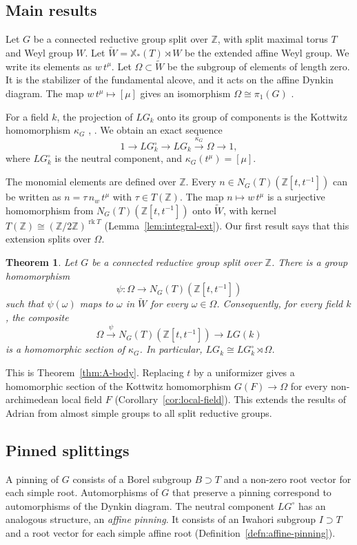 \documentclass[psamsfonts]{amsart}
\theoremstyle{definition}
\theoremstyle{remark}
\numberwithin{equation}{section}
\newcommand{\Z}{\mathbb{Z}}   %
\newcommand{\X}{\mathbb{X}}
\newcommand{\extw}{\widetilde{W}}
\newcommand{\ra}{\rightarrow}
\newcommand{\xra}{\xrightarrow}
\DeclareMathOperator{\rk}{rk}
\numberwithin{equation}{section}
\newcommand{\om}{\omega}
\newcommand{\Om}{\Omega}
\theoremstyle{plain}
\newtheorem{introthm}{Theorem}
\begin{document}
\subsection{Main results}
Let $G$ be a connected reductive group split over $\Z$, with split maximal torus $T$ and Weyl group $W$. Let $\extw=\X_*(T)\rtimes W$ be the extended affine Weyl group. We write its elements as $w\,t^{\mu}$. Let $\Om\subset\extw$ be the subgroup of elements of length zero. It is the stabilizer of the fundamental alcove, and it acts on the affine Dynkin diagram. The map $w\,t^{\mu}\mapsto[\mu]$ gives an isomorphism $\Om\cong\pi_1(G)$ \cite[Lemma~14]{HR08}.

For a field $k$, the projection of $LG_k$ onto its group of components is the Kottwitz homomorphism $\kappa_G$ \cite[\S7]{Ko97}, \cite[\S5]{PR08}. We obtain an exact sequence
\begin{equation}\label{eq:Kottwitz-seq}
1\ra LG_k^{\circ}\ra LG_k\xra{\kappa_G}\Om\ra 1,
\end{equation}
where $LG_k^{\circ}$ is the neutral component, and $\kappa_G(t^{\mu})=[\mu]$.

The monomial elements are defined over $\Z$. Every $n\in N_G(T)(\Z[t,t^{-1}])$ can be written as $n=\tau\,n_w\,t^{\mu}$ with $\tau\in T(\Z)$. The map $n\mapsto w\,t^{\mu}$ is a surjective homomorphism from $N_G(T)(\Z[t,t^{-1}])$ onto $\extw$, with kernel $T(\Z)\cong(\Z/2\Z)^{\rk T}$ (Lemma~\ref{lem:integral-ext}). Our first result says that this extension splits over $\Om$.

\begin{introthm}\label{thm:A}
Let $G$ be a connected reductive group split over $\Z$. There is a group homomorphism
\[
\psi\colon\Om\ra N_G(T)(\Z[t,t^{-1}])
\]
such that $\psi(\om)$ maps to $\om$ in $\extw$ for every $\om\in\Om$. Consequently, for every field $k$, the composite
\[
\Om\xra{\psi}N_G(T)(\Z[t,t^{-1}])\ra LG(k)
\]
is a homomorphic section of $\kappa_G$. In particular, $LG_k\cong LG_k^{\circ}\rtimes\Om$.
\end{introthm}

This is Theorem~\ref{thm:A-body}. Replacing $t$ by a uniformizer gives a homomorphic section of the Kottwitz homomorphism $G(F)\ra\Om$ for every non-archimedean local field $F$ (Corollary~\ref{cor:local-field}). This extends the results of Adrian from almost simple groups to all split reductive groups.

\subsection*{Pinned splittings}
A pinning of $G$ consists of a Borel subgroup $B\supset T$ and a non-zero root vector for each simple root. Automorphisms of $G$ that preserve a pinning correspond to automorphisms of the Dynkin diagram. The neutral component $LG^{\circ}$ has an analogous structure, an \emph{affine pinning}. It consists of an Iwahori subgroup $I\supset T$ and a root vector for each simple affine root (Definition~\ref{defn:affine-pinning}).
\end{document}
